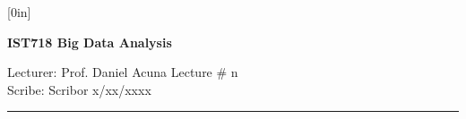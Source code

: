 \documentclass[11pt]{article}
\begin{document}
\thispagestyle{empty}

\raisebox{0.6in}[0in]{}
\vspace{-0.7in}

\begin{center}
\bf\large IST718 Big Data Analysis
\end{center}

\noindent
Lecturer:                Prof. Daniel Acuna
\hfill
Lecture \#               n
\\
Scribe:                  Scribor
\hfill
                         x/xx/xxxx

\noindent
\rule{\textwidth}{1pt}

\medskip




\end{document}
